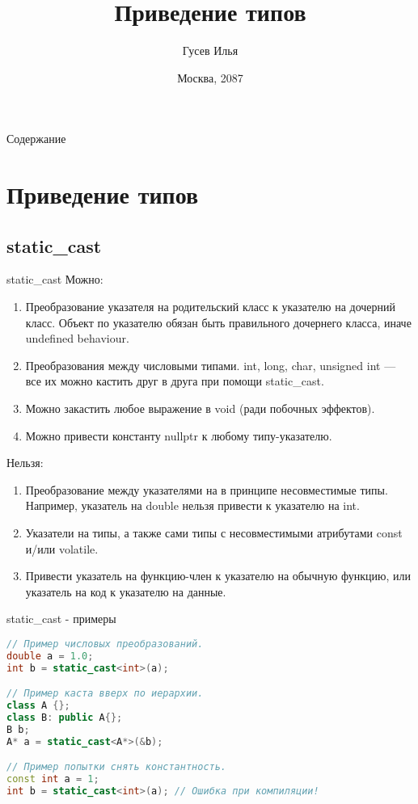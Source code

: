 \documentclass[10pt]{beamer}
\title[\href{https://goo.gl/NRgp8K}{https://goo.gl/NRgp8K} (Term 3)]{Приведение типов}
\author[Гусев Илья]{Гусев Илья}
\institute[МФТИ] 
{Московский физико-технический институт\\*}
\date{Москва, 2087}
\begin{document}
\begin{frame}
  \titlepage
\end{frame}

\begin{frame}{Содержание}
\tableofcontents
\end{frame}

\section{Приведение типов}

\subsection{static\_cast}
\begin{frame}[fragile]{static\_cast}
Можно:
\begin{enumerate}
    \item Преобразование указателя на родительский класс к указателю на дочерний класс. Объект по указателю обязан быть правильного дочернего класса, иначе undefined behaviour. 
    \item Преобразования между числовыми типами. int, long, char, unsigned int — все их можно кастить друг в друга при помощи static\_cast.
    \item Можно закастить любое выражение в void (ради побочных эффектов).
    \item Можно привести константу nullptr к любому типу-указателю.
\end{enumerate}
Нельзя:
\begin{enumerate}
    \item Преобразование между указателями на в принципе несовместимые типы. Например, указатель на double нельзя привести к указателю на int.
    \item Указатели на типы, а также сами типы с несовместимыми атрибутами const и/или volatile.
    \item Привести указатель на функцию-член к указателю на обычную функцию, или указатель на код к указателю на данные.
\end{enumerate}
\end{frame}

\begin{frame}[fragile]{static\_cast - примеры}
\begin{lstlisting}[language=C++]
// Пример числовых преобразований.
double a = 1.0;
int b = static_cast<int>(a);

// Пример каста вверх по иерархии.
class A {};
class B: public A{};
B b;
A* a = static_cast<A*>(&b);

// Пример попытки снять константность.
const int a = 1;
int b = static_cast<int>(a); // Ошибка при компиляции!
\end{lstlisting}
\end{frame}
\end{document}
